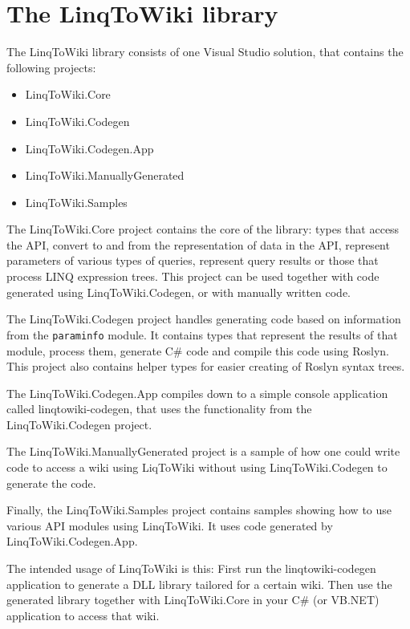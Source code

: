 \chapter{The LinqToWiki library}

The LinqToWiki library consists of one Visual Studio solution, that contains the following projects:

\begin{itemize}
\item LinqToWiki.Core
\item LinqToWiki.Codegen
\item LinqToWiki.Codegen.App
\item LinqToWiki.ManuallyGenerated
\item LinqToWiki.Samples
\end{itemize}

The LinqToWiki.Core project contains the core of the library:
types that access the API, convert to and from the representation of data in the API,
represent parameters of various types of queries, represent query results
or those that process LINQ expression trees.
This project can be used together with code generated using LinqToWiki.Codegen,
or with manually written code.

The LinqToWiki.Codegen project handles generating code based on information from the \texttt{paraminfo} module.
It contains types that represent the results of that module, process them, generate C\# code and compile this code using Roslyn.
This project also contains helper types for easier creating of Roslyn syntax trees.

The LinqToWiki.Codegen.App compiles down to a simple console application called linqtowiki-codegen,
that uses the functionality from the LinqToWiki.\allowbreak{}Codegen project.

The LinqToWiki.ManuallyGenerated project is a sample of how one could write code to access a wiki using LiqToWiki without using LinqToWiki.Codegen to generate the code.

Finally, the LinqToWiki.Samples project contains samples showing how to use various API modules using LinqToWiki.
It uses code generated by LinqToWiki.\allowbreak{}Codegen.\allowbreak{}App.

\medskip

The intended usage of LinqToWiki is this:
First run the linqtowiki-codegen application to generate a DLL library tailored for a certain wiki.
Then use the generated library together with LinqToWiki.Core in your C\# (or VB.NET) application to access that wiki.

